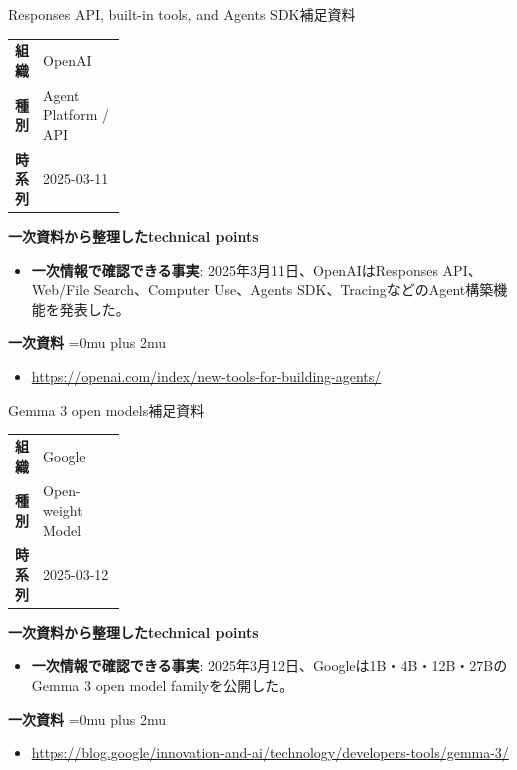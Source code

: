\begin{technicalnote}{Responses API, built-in tools, and Agents SDK}{補足資料}
\begingroup
\begin{tabularx}{\linewidth}{@{}>{\bfseries}p{0.22\linewidth}X@{}}
組織 & OpenAI \\
種別 & Agent Platform / API \\
時系列 & 2025-03-11 \\
\end{tabularx}
\smallskip
{\bfseries 一次資料から整理したtechnical points}
\begin{itemize}[leftmargin=1.5em,itemsep=0.35em]
\item \textbf{一次情報で確認できる事実}: 2025年3月11日、OpenAIはResponses API、Web/File Search、Computer Use、Agents SDK、TracingなどのAgent構築機能を発表した。
\end{itemize}
\begin{samepage}
{\bfseries 一次資料}
\begingroup\sloppy
\Urlmuskip=0mu plus 2mu\relax
\begin{itemize}[leftmargin=1.5em,itemsep=0.25em]
\item {\scriptsize\url{https://openai.com/index/new-tools-for-building-agents/}}
\end{itemize}
\endgroup
\end{samepage}
\endgroup
\end{technicalnote}
\medskip

\begin{technicalnote}{Gemma 3 open models}{補足資料}
\begingroup
\begin{tabularx}{\linewidth}{@{}>{\bfseries}p{0.22\linewidth}X@{}}
組織 & Google \\
種別 & Open-weight Model \\
時系列 & 2025-03-12 \\
\end{tabularx}
\smallskip
{\bfseries 一次資料から整理したtechnical points}
\begin{itemize}[leftmargin=1.5em,itemsep=0.35em]
\item \textbf{一次情報で確認できる事実}: 2025年3月12日、Googleは1B・4B・12B・27BのGemma 3 open model familyを公開した。
\end{itemize}
\begin{samepage}
{\bfseries 一次資料}
\begingroup\sloppy
\Urlmuskip=0mu plus 2mu\relax
\begin{itemize}[leftmargin=1.5em,itemsep=0.25em]
\item {\scriptsize\url{https://blog.google/innovation-and-ai/technology/developers-tools/gemma-3/}}
\end{itemize}
\endgroup
\end{samepage}
\endgroup
\end{technicalnote}
\medskip

